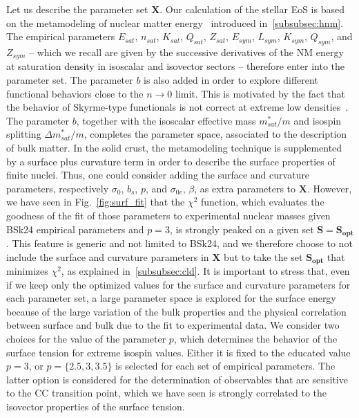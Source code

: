 Let us describe the parameter set $\bm{X}$. Our calculation
of the stellar EoS is based on the metamodeling of nuclear matter
energy~\cite{Margueron2018a} introduced in~\ref{subsubsec:hnm}. The empirical
parameters $E_{sat}$, $n_{sat}$, $K_{sat}$, $Q_{sat}$, $Z_{sat}$, $E_{sym}$,
$L_{sym}$, $K_{sym}$, $Q_{sym}$, and $Z_{sym}$ -- which we recall are given by 
the successive derivatives of the NM energy at saturation density in isoscalar 
and isovector sectors -- therefore 
enter into the parameter set. The parameter $b$ is also added in order 
to explore different functional behaviors close to the $n\rightarrow 0$ limit. 
{This is motivated by the fact that the behavior of Skyrme-type 
functionals is not correct at extreme low densities~\cite{Grasso2017}.}
The parameter $b$, together with the isoscalar effective mass $m_{sat}^*/m$ and 
isospin splitting $\Delta m_{sat}^*/m$, completes the parameter space, 
associated to the description of bulk matter.
In the solid crust, the metamodeling technique is supplemented by a surface 
plus curvature term in order to describe the surface properties of finite 
nuclei. Thus, one could consider adding the surface and curvature parameters, 
respectively $\sigma_0$, $b_s$, $p$, and $\sigma_{0c}$, $\beta$, as extra
parameters to $\bm{X}$. However, we have
seen in Fig.~\ref{fig:surf_fit} that the $\chi^2$ function, which evaluates the 
goodness of the fit of those parameters to experimental nuclear masses given 
BSk24 empirical parameters and $p=3$, is strongly peaked on a given set
$\bm{S}=\bm{S_{opt}}$. This feature is generic and not limited to BSk24, and we 
therefore choose to not include 
the surface and curvature parameters in $\bm{X}$ but to take the set 
$\bm{S_{opt}}$ that minimizes $\chi^2$, as explained in~\ref{subsubsec:cld}.
It is important to stress that, even if we keep only the optimized values for
the surface and curvature parameters for each parameter set, a large parameter
space is explored for the surface energy because of the large variation of the 
bulk properties and the physical correlation between surface and bulk due to 
the fit to experimental data.
We consider two choices for the value of the parameter $p$, which determines 
the behavior of the surface tension for extreme isospin values. Either it is 
fixed to the educated value $p=3$, or $p=\{2.5,3,3.5\}$ is selected for each
set of empirical parameters. The latter option is considered for the
determination of observables that are sensitive to the CC transition point, 
which we have seen is strongly correlated to the isovector properties of the 
surface tension.

